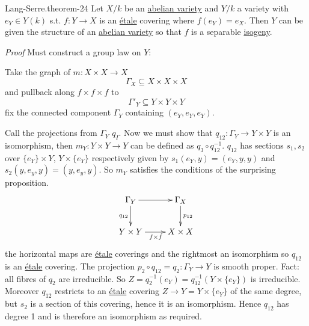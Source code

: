 \documentclass[10pt,]{book}
\makeatletter
\renewcommand*{\proofname}{Proof}
\renewenvironment{proof}[1][\proofname]{\par
  \pushQED{\qed}%
  \normalfont \topsep6\p@\@plus6\p@\relax
  \trivlist
  \item\relax
    {\itshape
    #1\@addpunct{.}}\hspace\labelsep\ignorespaces
}{%
  \popQED\endtrivlist\@endpefalse
}
\numberwithin{equation}{section}
\makeatother
\begin{document}
\begin{theorem}{Lang-Serre.}{}{theorem-24}%
\hypertarget{p-290}{}%
Let \(X/k\) be an \hyperref[def-buntes-abvar]{abelian variety} and \(Y/k\) a variety with \(e_Y\in Y(k)\) s.t. \(f\colon Y \to X\) is an \hyperref[def-etale]{étale} covering where \(f(e_Y) = e_X\). Then \(Y\) can be given the structure of an \hyperref[def-buntes-abvar]{abelian variety} so that \(f\) is a separable \hyperref[def-supersing-isog-isog]{isogeny}.%
\end{theorem}
\begin{proof}\hypertarget{proof-48}{}
\hypertarget{p-291}{}%
Must construct a group law on \(Y\):%
\par
\hypertarget{p-292}{}%
Take the graph of \(m\colon X\times X \to X\)%
\begin{equation*}
\Gamma_X \subseteq X\times X\times X
\end{equation*}
and pullback along \(f\times f\times f\) to%
\begin{equation*}
\Gamma'_Y \subseteq Y\times Y\times Y
\end{equation*}
fix the connected component \(\Gamma_Y\) containing \((e_Y,e_Y,e_Y)\).%
\par
\hypertarget{p-293}{}%
Call the projections from \(\Gamma_Y\) \(q_I\). Now we must show that \(q_{12}\colon \Gamma_Y \to Y\times Y\) is an isomorphism, then \(m_Y\colon Y\times Y \to Y\) can be defined as \(q_3 \circ q_{12}^{-1}\). \(q_{12}\) has sections \(s_1,s_2\) over \(\{e_Y\}\times Y\), \(Y\times \{e_Y\}\) respectively given by \(s_1(e_Y,y) = (e_Y,y,y)\) and \(s_2(y,e_y,y) = (y,e_y,y)\). So \(m_Y\) satisfies the conditions of the surprising proposition.%
\begin{equation*}
\xymatrix{
\Gamma_Y \ar[r]\ar[d]_{q_{12}} & \Gamma_X\ar[d]^{p_{12}} \\
Y\times Y \ar[r]_{f\times f} & X\times X
}
\end{equation*}
the horizontal maps are \hyperref[def-etale]{étale} coverings and the rightmost an isomorphism so \(q_{12}\) is an \hyperref[def-etale]{étale} covering. The projection \(p_2 \circ q_{12} = q_2 \colon \Gamma_Y\to Y\) is smooth proper. Fact: all fibres of \(q_2\) are irreducible. So \(Z = q_2^{-1} (e_Y) = q_{12}^{-1}(Y\times \{e_Y\})\) is irreducible. Moreover \(q_{12}\) restricts to an \hyperref[def-etale]{étale} covering \(Z \to Y = Y\times\{e_Y\}\) of  the same degree, but \(s_2\) is a section of this covering, hence it is an isomorphism. Hence \(q_{12}\) has degree 1 and is therefore an isomorphism as required.%
\end{proof}
\end{document}
